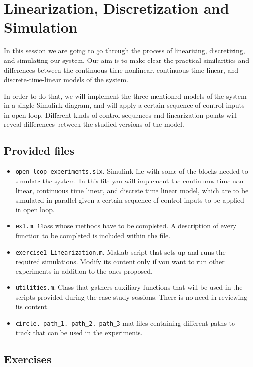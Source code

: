 \setcounter{chapter}{0}
\chapter{Linearization, Discretization and Simulation}
In this session we are going to go through the process of linearizing, discretizing, and simulating our system.
Our aim is to make clear the practical similarities and differences between the continuous-time-nonlinear, continuous-time-linear, and discrete-time-linear models of the system.\par
%
In order to do that, we will implement the three mentioned models of the system in a single Simulink diagram, and will apply a certain sequence of control inputs in open loop. 
Different kinds of control sequences and linearization points will reveal differences between the studied versions of the model. 
%
\section{Provided files}
\begin{itemize}
	\setlength\itemsep{0em}
	\item \texttt{open\_loop\_experiments.slx}.
		Simulink file with some of the blocks needed to simulate the system. 
		In this file you will implement the continuous time non-linear, continuous time linear, and discrete time linear model, which are to be simulated in parallel given a certain sequence of control inputs to be applied in open loop. 
	\item \texttt{ex1.m}.
		Class whose methods have to be completed.
		A description of every function to be completed is included within the file.
	\item \texttt{exercise1\_Linearization.m}.
		Matlab script that sets up and runs the required simulations.
		Modify its content only if you want to run other experiments in addition to the ones proposed.
	\item \texttt{utilities.m}.
		Class that gathers auxiliary functions that will be used in the scripts provided during the case study sessions.
		There is no need in reviewing its content.
	\item \texttt{circle, path\_1, path\_2, path\_3} mat files containing different paths to track that can be used in the experiments.
\end{itemize}		
%
\section{Exercises}
